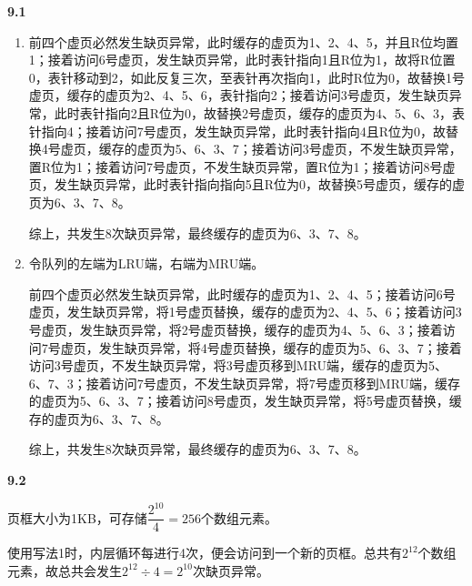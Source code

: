 \documentclass[UTF8]{report}
\begin{document}
\pagestyle{fancy}

\maketitle

\noindent
\textbf{9.1}

\begin{enumerate}[label=(\arabic*)]
  \item 前四个虚页必然发生缺页异常，此时缓存的虚页为1、2、4、5，并且R位均置1；接着访问6号虚页，发生缺页异常，此时表针指向1且R位为1，故将R位置0，表针移动到2，如此反复三次，至表针再次指向1，此时R位为0，故替换1号虚页，缓存的虚页为2、4、5、6，表针指向2；接着访问3号虚页，发生缺页异常，此时表针指向2且R位为0，故替换2号虚页，缓存的虚页为4、5、6、3，表针指向4；接着访问7号虚页，发生缺页异常，此时表针指向4且R位为0，故替换4号虚页，缓存的虚页为5、6、3、7；接着访问3号虚页，不发生缺页异常，置R位为1；接着访问7号虚页，不发生缺页异常，置R位为1；接着访问8号虚页，发生缺页异常，此时表针指向指向5且R位为0，故替换5号虚页，缓存的虚页为6、3、7、8。
  
  综上，共发生8次缺页异常，最终缓存的虚页为6、3、7、8。
  \item 令队列的左端为LRU端，右端为MRU端。
  
  前四个虚页必然发生缺页异常，此时缓存的虚页为1、2、4、5；接着访问6号虚页，发生缺页异常，将1号虚页替换，缓存的虚页为2、4、5、6；接着访问3号虚页，发生缺页异常，将2号虚页替换，缓存的虚页为4、5、6、3；接着访问7号虚页，发生缺页异常，将4号虚页替换，缓存的虚页为5、6、3、7；接着访问3号虚页，不发生缺页异常，将3号虚页移到MRU端，缓存的虚页为5、6、7、3；接着访问7号虚页，不发生缺页异常，将7号虚页移到MRU端，缓存的虚页为5、6、3、7；接着访问8号虚页，发生缺页异常，将5号虚页替换，缓存的虚页为6、3、7、8。
  
  综上，共发生8次缺页异常，最终缓存的虚页为6、3、7、8。
\end{enumerate}

\noindent
\textbf{9.2}

页框大小为1KB，可存储$\dfrac{2^{10}}{4} = 256$个数组元素。

使用写法1时，内层循环每进行4次，便会访问到一个新的页框。总共有$2^{12}$个数组元素，故总共会发生$2^{12} \div 4 = 2^{10}$次缺页异常。
\end{document}
